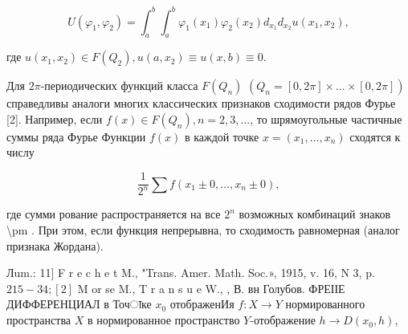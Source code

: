 \documentclass[10pt]{article}
\begin{document}
\[

U\left(\varphi_{1}, \varphi_{2}\right)=\int_{a}^{b} \int_{a}^{b} \varphi_{1}\left(x_{1}\right) \varphi_{2}\left(x_{2}\right) d_{x_{1}} d_{x_{2}} u\left(x_{1}, x_{2}\right),

\]



где $u\left(x_{1}, x_{2}\right) \in F\left(Q_{2}\right), u\left(a, x_{2}\right) \equiv u(x, b) \equiv 0$.



Для $2 \pi$-периодических функций класса $F\left(Q_{n}\right)$ $\left(Q_{n}=[0,2 \pi] \times \ldots \times[0,2 \pi]\right)$ справедливы аналоги многих классических признаков сходимости рядов Фурье [2]. Например, если $f(x) \in F\left(Q_{n}\right), n=2,3, \ldots$, то шрямоугольные частичные суммы ряда Фурье Функции $f(x)$ в каждой точке $x=\left(x_{1}, \ldots, x_{n}\right)$ сходятся к числу



\[

\frac{1}{2^{n}} \sum f\left(x_{1} \pm 0, \ldots, x_{n} \pm 0\right),

\]



где сумми рование распространяется на все $2^{n}$ возможных комбинаций знаков \textbackslash pm . При этом, если функция непрерывна, то сходимость равномерная (аналог признака Жордана).



Лum.: 11] F r e c h e t M., "Trans. Amer. Math. Soc.», 1915, v. 16, N 3, p. $215-34 ;[2]$ M or se M., T r a n s u e W., , В. вн Голубов. ФРЕІІЕ ДИФФЕРЕНЦИАЛ в Точाке $x_{0}$ отображенИя $f: X \longrightarrow Y$ нормированного пространства $X$ в нормированное пространство $Y$-отображение $h \rightarrow D\left(x_{0}, h\right)$,
\end{document}
